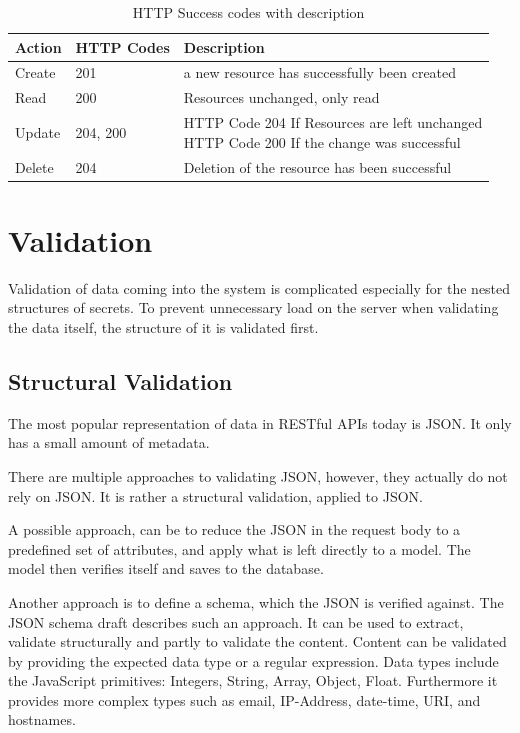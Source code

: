 \begin{table}
  \begin{tabular}{|l|l|l|}
    \hline
    Action & HTTP Codes & Description \\ \hline
    Create & 201 & a new resource has successfully been created \\ \hline
    Read & 200 & Resources unchanged, only read \\ \hline
    Update & 204, 200 & \parbox[t]{9cm}{HTTP Code 204 If Resources are left unchanged\\ HTTP Code 200 If the change was successful} \\ \hline
    Delete & 204 & Deletion of the resource has been successful \\ \hline
  \end{tabular}
  \caption{HTTP Success codes with description}
  \centering
  \label{tab:success_codes}
\end{table}

\section{Validation}

Validation of data coming into the system is complicated especially for the
nested structures of secrets. To prevent unnecessary load on the server when
validating the data itself, the structure of it is validated first.

\subsection{Structural Validation}

The most popular representation of data in RESTful APIs today is JSON. It only
has a small amount of metadata.

There are multiple approaches to validating JSON, however, they actually do not
rely on JSON. It is rather a structural validation, applied to JSON.

A possible approach, can be to reduce the JSON in the request body to a
predefined set of attributes, and apply what is left directly to a model. The
model then verifies itself and saves to the database.

Another approach is to define a schema, which the JSON is verified against. The
JSON schema draft describes such an approach. It can be used to extract,
validate structurally and partly to validate the content. Content can be
validated by providing the expected data type or a regular expression. Data types
include the JavaScript primitives: Integers, String, Array, Object, Float.
Furthermore it provides more complex types such as email, IP-Address,
date-time, URI, and hostnames.

